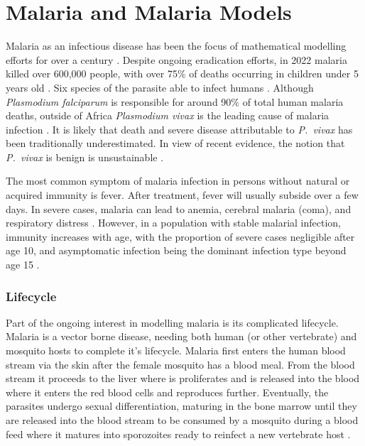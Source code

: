 \chapter{Malaria and Malaria Models}

Malaria as an infectious disease has been the focus of mathematical
modelling efforts for over a century \parencite{smith_ross_2012}.
Despite ongoing eradication efforts, in 2022
malaria killed over 600,000 people, with over 75\% of deaths
occurring in children under 5 years old
\parencite{world_health_organization_world_2022}. Six
species of the parasite able to infect humans
\parencite{milner_malaria_2018}. Although \textit{Plasmodium falciparum} is
responsible for around 90\% of total human malaria deaths, outside of Africa
\textit{Plasmodium vivax} is the leading cause of malaria infection
\parencite{zekar_plasmodium_2023, adams_biology_2017}.
It is likely that death and severe disease attributable to \textit{P.\ vivax}
has been traditionally underestimated. In view of recent evidence, the
notion that \textit{P.\ vivax} is benign is unsustainable
\parencite{cowman_malaria_2016}.

The most common symptom of malaria infection in persons without natural or
acquired immunity is fever. After treatment, fever will usually subside over a
few days. In severe cases, malaria can lead to anemia, cerebral malaria (coma),
and respiratory distress \parencite{cowman_malaria_2016}. However,
in a population with stable malarial infection, immunity increases with age,
with the proportion of severe cases negligible after age 10, and asymptomatic
infection being the dominant infection type beyond age 15
\parencite{cowman_malaria_2016}.

\subsection*{Lifecycle}

Part of the ongoing interest in modelling malaria is its complicated lifecycle.
Malaria is a vector borne disease, needing both human (or other vertebrate) and
mosquito hosts to complete it's lifecycle. Malaria first
enters the human blood stream via the skin after the
female mosquito has a blood meal. From the blood stream it proceeds to
the liver where is proliferates and is released into the blood where it enters
the red blood cells and reproduces further. Eventually, the
parasites undergo sexual differentiation, maturing in the bone marrow
until they are
released into the blood stream to be consumed by a mosquito during a blood feed
where it matures into sporozoites ready to reinfect a new vertebrate host
\parencite{cowman_malaria_2016}.

